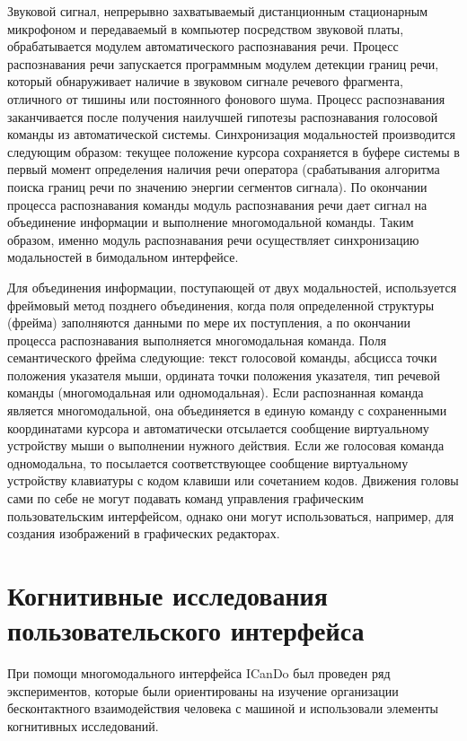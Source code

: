 \begin{multicols}{2}
  Звуковой сигнал, непрерывно захватываемый дистанционным стационарным 
микрофоном и передаваемый в компьютер посредством звуковой платы, 
обрабатывается модулем автоматического распознавания речи. Процесс 
распознавания речи запускается программным модулем детекции границ речи, 
который обнаруживает наличие в звуковом сигнале речевого фрагмента, 
отличного от тишины или постоянного фонового шума. Процесс распознавания 
заканчивается после получения наилучшей гипотезы распознавания голосовой 
команды из автоматической системы. Синхронизация модальностей 
производится следующим образом: текущее положение курсора сохраняется в 
буфере системы в первый момент определения наличия речи оператора 
(срабатывания алгоритма поиска границ речи по значению энергии сегментов 
сигнала). По окончании процесса распознавания команды модуль 
распознавания речи дает сигнал на объединение информации и выполнение 
многомодальной команды. Таким образом, именно модуль распознавания речи 
осуществляет синхронизацию модальностей в бимодальном интерфейсе.
  
  Для объединения информации, поступающей от двух модальностей, 
используется фреймовый метод позднего объединения, когда поля 
определенной структуры (фрейма) заполняются данными по мере их 
поступления, а по окончании процесса распознавания выполняется 
многомодальная команда. Поля семантического фрейма следующие: текст 
голосовой команды, абсцисса точки положения указателя мыши, ордината 
точки положения указателя, тип речевой команды (многомодальная или 
одномодальная). Если распознанная команда является 
многомодальной, она объединяется в единую команду с сохраненными 
координатами курсора и автоматически отсылается сообщение виртуальному 
устройству мыши о выполнении нужного действия. Если же голосовая команда 
одномодальна, то посылается соответствующее сообщение виртуальному 
устройству клавиатуры с кодом клавиши или сочетанием кодов. Движения 
головы сами по себе не могут подавать команд управления графическим 
пользовательским интерфейсом, однако они могут использоваться, например, 
для создания изображений в графических редакторах.
  
\section{Когнитивные исследования пользовательского интерфейса}
  
  При помощи многомодального интерфейса ICanDo был проведен ряд 
экспериментов, которые были ориентированы на изучение организации 
бесконтактного взаимодействия человека с машиной и использовали элементы 
когнитивных исследований.


\end{multicols}
